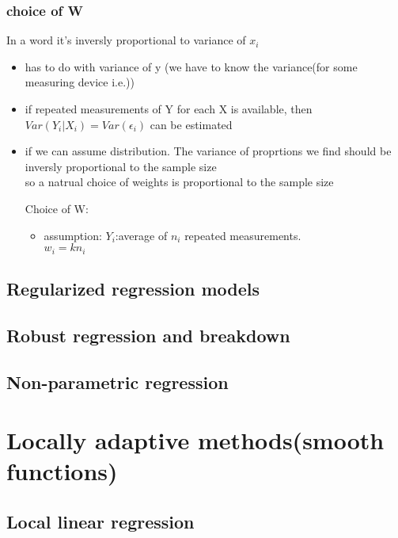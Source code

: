 \documentclass[10pt]{article}
\theoremstyle{break}
\begin{document}
            \subsubsection{choice of W}
                In a word it's inversly proportional to variance of $x_i$
                \begin{itemize}
                    \item has to do with variance of y (we have to know the variance(for some measuring device i.e.))
                    \item if repeated measurements of Y for each X is available, then $Var(Y_i|X_i)=Var(\epsilon_i)$
                            can be estimated
                    \item if we can assume distribution. The variance of proprtions we find should be inversly proportional to the sample size\\
                            so a natrual choice of weights is proportional to the sample size
                    
                    Choice of W:
                    \begin{itemize}
                        \item assumption: $Y_i$:average of $n_i$ repeated measurements.\\$w_i = k n_i$
                    \end{itemize}
                \end{itemize}



    \subsection{Regularized regression models}
    \subsection{Robust regression and breakdown}
    \subsection{Non-parametric regression}
\section{Locally adaptive methods(smooth functions)}
    \subsection{Local linear regression}
\end{document}
